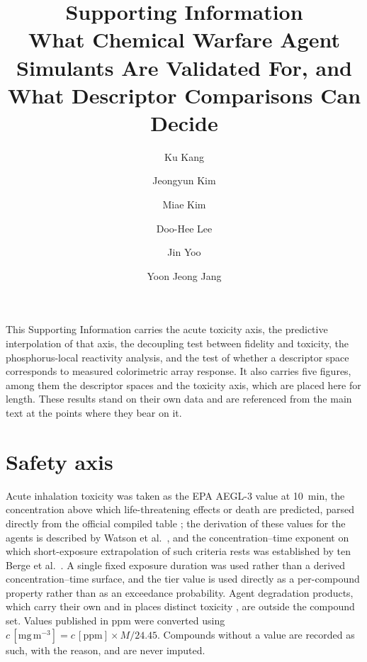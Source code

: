\documentclass[11pt,a4paper]{article}
\title{Supporting Information\\[4pt]
\large What Chemical Warfare Agent Simulants Are Validated For, and What Descriptor Comparisons Can Decide}
\author{Ku Kang \and Jeongyun Kim \and Miae Kim \and Doo-Hee Lee \and Jin Yoo
  \and Yoon Jeong Jang}
\date{}
\begin{document}
\maketitle

\noindent This Supporting Information carries the acute toxicity axis, the
predictive interpolation of that axis, the decoupling test between fidelity and
toxicity, the phosphorus-local reactivity analysis, and the test of whether a
descriptor space corresponds to measured colorimetric array response. It also carries five figures, among them the descriptor
spaces and the toxicity axis, which are placed here for length. These results
stand on their own data and are referenced from the main text at the points
where they bear on it.

\section{Safety axis}
\label{meth:aegl}
Acute inhalation toxicity was taken as the EPA AEGL-3 value at 10~min,
the concentration above which life-threatening effects or death are predicted,
parsed directly from the official compiled table \cite{epaaegl2018}; the
derivation of these values for the agents is described by
Watson et al.~\cite{watson2006}, and the concentration--time exponent on which short-exposure
extrapolation of such criteria rests was established by ten Berge et al.~\cite{tenberge1986}.
A single fixed exposure duration was used rather than a derived
concentration--time surface, and the tier value is used directly as a
per-compound property rather than as an exceedance probability. Agent
degradation products, which carry their own and in places
distinct toxicity \cite{munro1999}, are outside the compound set. Values
published in ppm were converted using
$c\,[\mathrm{mg\,m^{-3}}] = c\,[\mathrm{ppm}] \times M / 24.45$. Compounds
without a value are recorded as such, with the reason, and are never imputed.
\end{document}
